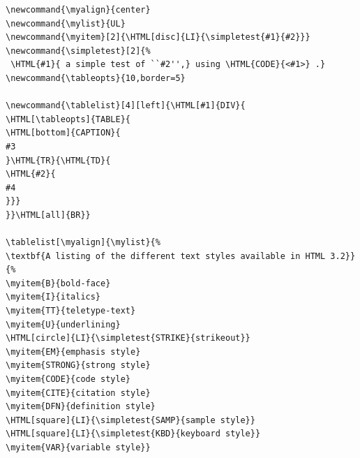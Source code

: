 
\begin{small}
\begin{verbatim}
\newcommand{\myalign}{center}
\newcommand{\mylist}{UL}
\newcommand{\myitem}[2]{\HTML[disc]{LI}{\simpletest{#1}{#2}}}
\newcommand{\simpletest}[2]{%
 \HTML{#1}{ a simple test of ``#2'',} using \HTML{CODE}{<#1>} .}
\newcommand{\tableopts}{10,border=5}

\newcommand{\tablelist}[4][left]{\HTML[#1]{DIV}{
\HTML[\tableopts]{TABLE}{
\HTML[bottom]{CAPTION}{
#3
}\HTML{TR}{\HTML{TD}{
\HTML{#2}{
#4
}}}
}}\HTML[all]{BR}}

\tablelist[\myalign]{\mylist}{%
\textbf{A listing of the different text styles available in HTML 3.2}}{%
\myitem{B}{bold-face}
\myitem{I}{italics}
\myitem{TT}{teletype-text}
\myitem{U}{underlining}
\HTML[circle]{LI}{\simpletest{STRIKE}{strikeout}}
\myitem{EM}{emphasis style}
\myitem{STRONG}{strong style}
\myitem{CODE}{code style}
\myitem{CITE}{citation style}
\myitem{DFN}{definition style}
\HTML[square]{LI}{\simpletest{SAMP}{sample style}}
\HTML[square]{LI}{\simpletest{KBD}{keyboard style}}
\myitem{VAR}{variable style}}
\end{verbatim}
\end{small}


